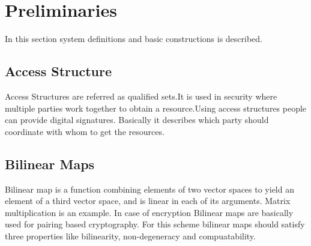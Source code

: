 \documentclass[a4paper,12pt]{article}
\begin{document}
\section{Preliminaries}
In this section system definitions and basic constructions is described.
\subsection{Access Structure}
Access Structures are referred as qualified sets.It is used in security where multiple parties work together to obtain a resource.Using access structures people can provide digital signatures. Basically it describes which party should coordinate with whom to get the resources.
\subsection{Bilinear Maps}
 Bilinear map is a function combining elements of two vector spaces to yield an element of a third vector space, and is linear in each of its arguments. Matrix multiplication is an example. In case of encryption Bilinear maps are basically used for pairing based cryptography.
 For this scheme bilinear maps should satisfy three properties like bilinearity, non-degeneracy and compuatability.
\end{document}
